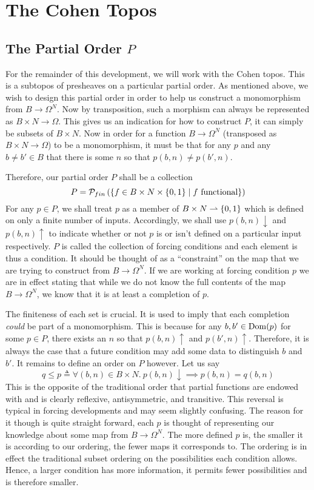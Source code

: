 \section{The Cohen Topos}\label{sec:cohentopos}
\subsection{The Partial Order \texorpdfstring{$P$}{P}}\label{subsec:partialorder}\hfill

For the remainder of this development, we will work with the Cohen
topos. This is a subtopos of presheaves on a particular partial
order. As mentioned above, we wish to design this partial order in
order to help us construct a monomorphism from $B \to \Omega^N$. Now
by transposition, such a morphism can always be represented as
$B \times N \to \Omega$. This gives us an indication for how to
construct $P$, it can simply be subsets of $B \times N$. Now in order
for a function $B \to \Omega^N$ (transposed as
$B \times N \to \Omega$) to be a monomorphism, it must be that for any
$p$ and any $b \neq b' \in B$ that there is some $n$ so that
$p(b, n) \neq p(b', n)$.

Therefore, our partial order $P$ shall be a collection
\[
  P = \mathcal{P}_{fin}\left(\{f \in B \times N \times \{0, 1\} \mid f \text{ functional}\}\right)
\]
For any $p \in P$, we shall treat $p$ as a member of
$B \times N \rightharpoonup \{0, 1\}$ which is defined on only a finite number of
inputs. Accordingly, we shall use $p(b, n) \downarrow$ and
$p(b, n)\uparrow$ to indicate whether or not $p$ is or isn't defined
on a particular input respectively. $P$ is called the collection of
forcing conditions and each element is thus a condition. It should be
thought of as a ``constraint'' on the map that we are trying to
construct from $B \to \Omega^N$. If we are working at forcing
condition $p$ we are in effect stating that while we do not know the
full contents of the map $B \to \Omega^N$, we know that it is at least
a completion of $p$.

The finiteness of each set is crucial. It is used to imply that each
completion \emph{could} be part of a monomorphism. This is because for
any $b, b' \in \operatorname{Dom}(p)$ for some $p \in P$, there exists an $n$ so
that $p(b, n) \uparrow$ and $p(b', n) \uparrow$. Therefore, it is
always the case that a future condition may add some data to
distinguish $b$ and $b'$. It remains to define an order on $P$
however. Let us say
\[
  q \le p \triangleq \forall (b, n) \in B \times N.
  \ p(b, n) \downarrow \implies p(b, n) = q(b, n)
\]
This is the opposite of the traditional order that partial functions
are endowed with and is clearly reflexive, antisymmetric, and
transitive. This reversal is typical in forcing developments and may
seem slightly confusing. The reason for it though is quite straight
forward, each $p$ is thought of representing our knowledge about some
map from $B \to \Omega^N$. The more defined $p$ is, the smaller it is
according to our ordering, the fewer maps it corresponds to. The
ordering is in effect the traditional subset ordering on the
possibilities each condition allows. Hence, a larger condition has
more information, it permits fewer possibilities and is therefore
smaller.


